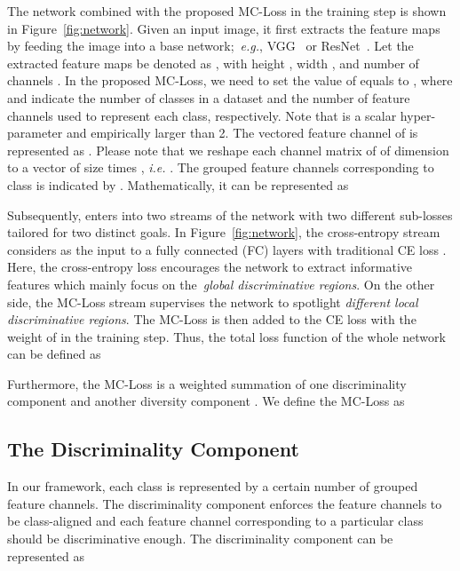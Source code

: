 \documentclass[journal]{IEEEtran}
\begin{document}
The network combined with the proposed MC-Loss in the training step is shown in Figure~\ref{fig:network}. Given an input image, it first extracts the feature maps by feeding the image into a base network;~\emph{e.g.}, VGG~\cite{simonyan2014very} or ResNet~\cite{he2016deep}. Let the extracted feature maps be denoted as , with height , width ,  and number of channels . In the proposed MC-Loss, we need to set the value of  equals to , where  and  indicate the number of classes in a dataset and the number of feature channels used to represent each class, respectively. Note that  is a scalar hyper-parameter and empirically larger than 2. The   vectored feature channel of  is represented as . Please note that we reshape each channel matrix of  of dimension  to a vector of size  \!times , \emph{i.e.} . The grouped feature channels corresponding to  class is indicated by . Mathematically, it can be represented as





Subsequently,  enters into two streams of the network with two different sub-losses tailored for two distinct goals. In Figure~\ref{fig:network}, the cross-entropy stream considers  as the input to a fully connected (FC) layers with traditional CE loss . Here, the cross-entropy loss encourages the network to extract informative features which mainly focus on the~\emph{global discriminative regions}. On the other side, the MC-Loss stream supervises the network to spotlight \emph{different local discriminative regions}. The MC-Loss is then added to the CE loss with the weight of  in the training step. Thus, the total loss function of the whole network can be defined as



Furthermore, the MC-Loss is a weighted summation of one discriminality  component  and  another  diversity component . We define the MC-Loss as







\subsection{The Discriminality Component}

In our framework, each class is represented by a certain number of grouped feature channels.
The discriminality component enforces the feature channels to be class-aligned and each feature channel corresponding to a particular class should be discriminative enough. The discriminality component  can be represented as
\end{document}
